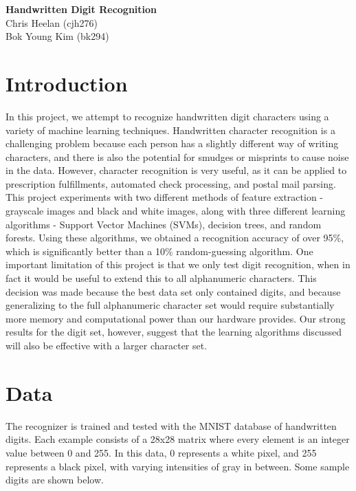 \documentclass[12pt]{article}
\begin{document}
\begin{center}
\Large{\textbf{Handwritten Digit Recognition}} \\ Chris Heelan (cjh276) \\ Bok Young Kim (bk294)
\end{center}

\section*{Introduction}
In this project, we attempt to recognize handwritten digit characters using a variety of machine learning techniques. Handwritten character recognition is a challenging problem because each person has a slightly different way of writing characters, and there is also the potential for smudges or misprints to cause noise in the data. However, character recognition is very useful, as it can be applied to prescription fulfillments, automated check processing, and postal mail parsing. This project experiments with two different methods of feature extraction - grayscale images and black and white images, along with three different learning algorithms - Support Vector Machines (SVMs), decision trees, and random forests. Using these algorithms, we obtained a recognition accuracy of over 95\%, which is significantly better than a 10\% random-guessing algorithm. One important limitation of this project is that we only test digit recognition, when in fact it would be useful to extend this to all alphanumeric characters. This decision was made because the best data set only contained digits, and because generalizing to the full alphanumeric character set would require substantially more memory and computational power than our hardware provides. Our strong results for the digit set, however, suggest that the learning algorithms discussed will also be effective with a larger character set.

\section*{Data}
The recognizer is trained and tested with the MNIST database of handwritten digits. Each example consists of a 28x28 matrix where every element is an integer value between 0 and 255. In this data, 0 represents a white pixel, and 255 represents a black pixel, with varying intensities of gray in between. Some sample digits are shown below.
\end{document}
